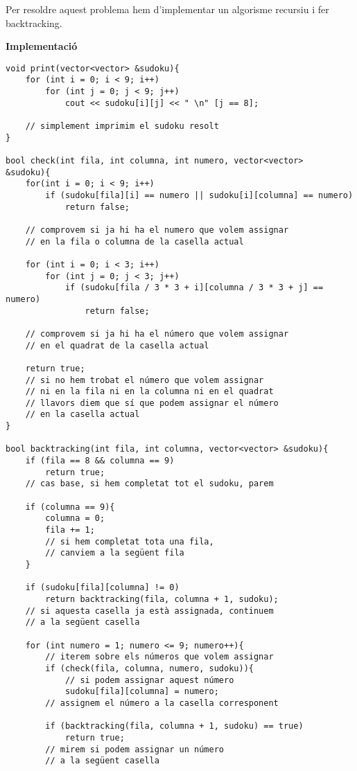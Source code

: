 Per resoldre aquest problema hem d'implementar un algorisme recursiu i fer backtracking. \newline

\textbf{Implementació}

\begin{lstlisting}
void print(vector<vector> &sudoku){
    for (int i = 0; i < 9; i++)
        for (int j = 0; j < 9; j++)
            cout << sudoku[i][j] << " \n" [j == 8];

    // simplement imprimim el sudoku resolt
}

bool check(int fila, int columna, int numero, vector<vector>
&sudoku){
    for(int i = 0; i < 9; i++)
        if (sudoku[fila][i] == numero || sudoku[i][columna] == numero)
            return false;
    
    // comprovem si ja hi ha el numero que volem assignar
    // en la fila o columna de la casella actual
    
    for (int i = 0; i < 3; i++)
        for (int j = 0; j < 3; j++)
            if (sudoku[fila / 3 * 3 + i][columna / 3 * 3 + j] == numero)
                return false;
    
    // comprovem si ja hi ha el número que volem assignar
    // en el quadrat de la casella actual
    
    return true;
    // si no hem trobat el número que volem assignar
    // ni en la fila ni en la columna ni en el quadrat
    // llavors diem que sí que podem assignar el número
    // en la casella actual
}

bool backtracking(int fila, int columna, vector<vector> &sudoku){
    if (fila == 8 && columna == 9)
        return true;
    // cas base, si hem completat tot el sudoku, parem
    
    if (columna == 9){
        columna = 0;
        fila += 1;
        // si hem completat tota una fila,
        // canviem a la següent fila
    }
    
    if (sudoku[fila][columna] != 0)
        return backtracking(fila, columna + 1, sudoku);
    // si aquesta casella ja està assignada, continuem
    // a la següent casella
    
    for (int numero = 1; numero <= 9; numero++){
        // iterem sobre els números que volem assignar
        if (check(fila, columna, numero, sudoku)){
            // si podem assignar aquest número
            sudoku[fila][columna] = numero;
        // assignem el número a la casella corresponent
    
        if (backtracking(fila, columna + 1, sudoku) == true)
            return true;
        // mirem si podem assignar un número
        // a la següent casella
        

\end{lstlisting}
